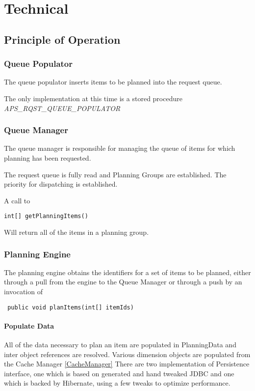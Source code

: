 \part{Technical}

\chapter {Principle of Operation}
\section{Queue Populator}
The queue populator inserts items to be planned into the request queue.

The only implementation at this time is a stored procedure \textit{APS\_RQST\_QUEUE\_POPULATOR}

\section{Queue Manager}
The queue manager is responsible for managing the queue of items for which planning has been requested.

The request queue is fully read and Planning Groups are established.  
The priority for dispatching is established.

A call to 
\begin{verbatim}
int[] getPlanningItems()
\end{verbatim}
Will return all of the items in a planning group.

\section{Planning Engine}

The planning engine obtains the identifiers for a set of items to be planned, either through a pull from 
the engine to the Queue Manager or through a push by an invocation of 
\begin{verbatim}
 public void planItems(int[] itemIds)
\end{verbatim}
\subsection{Populate Data}

All of the data necessary to plan an item are populated in PlanningData and inter object references are 
resolved.  Various dimension objects are populated from the Cache Manager \ref{CacheManager}
There are two implementation of Persistence interface, one which is based on generated and hand tweaked JDBC
and one which is backed by Hibernate, using a few tweaks to optimize performance.

